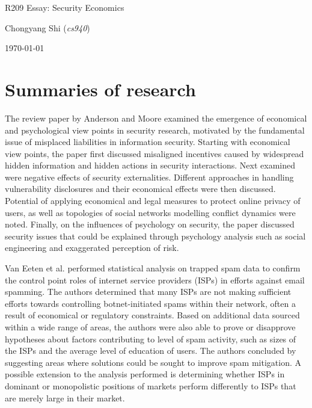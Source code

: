 \documentclass[11pt]{article}
\begin{document}
\centerline{\Large R209 Essay:  Security Economics}
\vspace{2em}
\centerline{\large Chongyang Shi (\emph{cs940})}
\vspace{1em}
\centerline{\large \today}
\vspace{1em}

\section{Summaries of research}

The review paper by Anderson and Moore \cite{anderson2009information} examined the emergence of economical and psychological view points in security research, motivated by the fundamental issue of misplaced liabilities in information security. Starting with economical view points, the paper first discussed misaligned incentives caused by widespread hidden information and hidden actions in security interactions. Next examined were negative effects of security externalities. Different approaches in handling vulnerability disclosures and their economical effects were then discussed. Potential of applying economical and legal measures to protect online privacy of users, as well as topologies of social networks modelling conflict dynamics were noted. Finally, on the influences of psychology on security, the paper discussed security issues that could be explained through psychology analysis such as social engineering and exaggerated perception of risk.

Van Eeten et al. \cite{van2010role} performed statistical analysis on trapped spam data to confirm the control point roles of internet service providers (ISPs) in efforts against email spamming. The authors determined that many ISPs are not making sufficient efforts towards controlling botnet-initiated spams within their network, often a result of economical or regulatory constraints. Based on additional data sourced within a wide range of areas, the authors were also able to prove or disapprove hypotheses about factors contributing to level of spam activity, such as sizes of the ISPs and the average level of education of users. The authors concluded by suggesting areas where solutions could be sought to improve spam mitigation. A possible extension to the analysis performed is determining whether ISPs in dominant or monopolistic positions of markets perform differently to ISPs that are merely large in their market.
\end{document}
